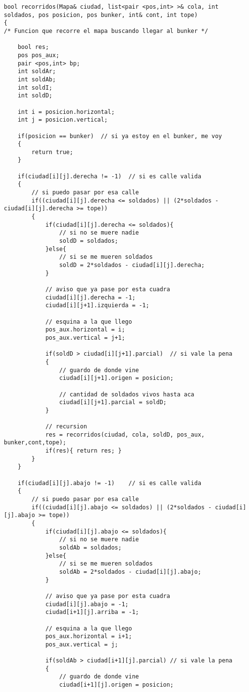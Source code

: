 \documentclass[a4paper]{article}
\begin{document}
\begin{lstlisting}
bool recorridos(Mapa& ciudad, list<pair <pos,int> >& cola, int soldados, pos posicion, pos bunker, int& cont, int tope)
{
/* Funcion que recorre el mapa buscando llegar al bunker */
	
	bool res;
	pos pos_aux;
	pair <pos,int> bp;
	int soldAr;
	int soldAb;
	int soldI;
	int soldD;
	
	int i = posicion.horizontal;
	int j = posicion.vertical;
	
	if(posicion == bunker)	// si ya estoy en el bunker, me voy
	{
		return true;
	}
	
	if(ciudad[i][j].derecha != -1)	// si es calle valida
	{
		// si puedo pasar por esa calle
		if((ciudad[i][j].derecha <= soldados) || (2*soldados - ciudad[i][j].derecha >= tope))
		{
			if(ciudad[i][j].derecha <= soldados){
				// si no se muere nadie
				soldD = soldados;
			}else{
				// si se me mueren soldados
				soldD = 2*soldados - ciudad[i][j].derecha;
			}
			
			// aviso que ya pase por esta cuadra
			ciudad[i][j].derecha = -1;
			ciudad[i][j+1].izquierda = -1;
			
			// esquina a la que llego
			pos_aux.horizontal = i;
			pos_aux.vertical = j+1;
			
			if(soldD > ciudad[i][j+1].parcial)	// si vale la pena
			{
				// guardo de donde vine
				ciudad[i][j+1].origen = posicion;
				
				// cantidad de soldados vivos hasta aca
				ciudad[i][j+1].parcial = soldD;
			}
			
			// recursion
			res = recorridos(ciudad, cola, soldD, pos_aux, bunker,cont,tope);
			if(res){ return res; }
		}
	}
	
	if(ciudad[i][j].abajo != -1)	// si es calle valida
	{
		// si puedo pasar por esa calle
		if((ciudad[i][j].abajo <= soldados) || (2*soldados - ciudad[i][j].abajo >= tope))
		{
			if(ciudad[i][j].abajo <= soldados){
				// si no se muere nadie
				soldAb = soldados;
			}else{
				// si se me mueren soldados
				soldAb = 2*soldados - ciudad[i][j].abajo;
			}
				
			// aviso que ya pase por esta cuadra
			ciudad[i][j].abajo = -1;
			ciudad[i+1][j].arriba = -1;
			
			// esquina a la que llego
			pos_aux.horizontal = i+1;
			pos_aux.vertical = j;
			
			if(soldAb > ciudad[i+1][j].parcial)	// si vale la pena
			{
				// guardo de donde vine
				ciudad[i+1][j].origen = posicion;
				

\end{lstlisting}
\end{document}
